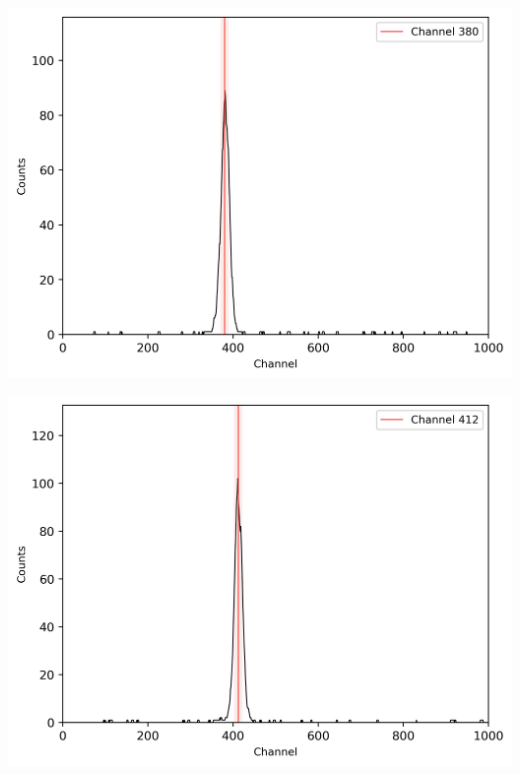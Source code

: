 \begin{center}
    \begin{adjustbox}{max width=\linewidth, keepaspectratio}
        \includegraphics[]{png/60CoZeitspektrum40ns}
    \end{adjustbox}
    \label{fig:}
\end{center}
%
\begin{center}
    \begin{adjustbox}{max width=\linewidth, keepaspectratio}
        \includegraphics[]{png/60CoZeitspektrum60ns}
    \end{adjustbox}
    \label{fig:}
\end{center}
%
